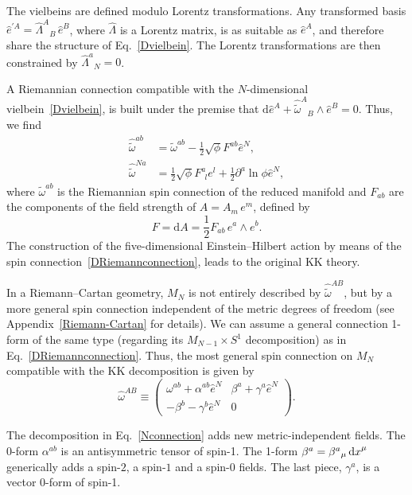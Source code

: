 \documentclass[aps,prd,12pt,superscriptaddress,showpacs,showkeys,reprint,nofootinbib]{revtex4-1}
\begin{document}
The vielbeins are defined modulo Lorentz transformations. Any transformed basis $\hat{e}^{\prime A} = \hat{\Lambda}^A{}_{B}\,\hat{e}^B$,
where $\hat{\Lambda}$ is a Lorentz matrix, is as suitable as $\hat{e}^A$, and therefore share the structure of Eq.~\eqref{Dvielbein}. The Lorentz transformations are then constrained by $\hat{\Lambda}^a{}_{N}=0$.

A Riemannian connection compatible with the \mbox{$N$-dimensional} vielbein~\eqref{Dvielbein}, is built under the premise that $\mbox{d}\hat{e}^A + \hat{\tilde{\omega}}^{A}{}_B \wedge \hat{e}^B = 0$. Thus, we find
\begin{equation}
  \label{DRiemannconnection}
  \begin{split}
    \hat{\tilde{\omega}}^{ab}&=\tilde{\omega}^{ab}-\frac{1}{2}\sqrt{\phi}F^{ab}\hat{e}^N,\\
    \hat{\tilde{\omega}}^{Na}&=\frac{1}{2}\sqrt{\phi}F^a_{\ \ l}e^l+\frac{1}{2}\partial^a\ln\phi\hat{e}^N,
  \end{split}
\end{equation}
where $\tilde{\omega}^{ab}$ is the Riemannian spin connection of the reduced manifold and $F_{ab}$ are the components of the field strength of $A = A_m\, e^m$, defined by
\begin{equation}
  F=\text{d}A=\frac{1}{2}F_{ab}\, e^a\wedge e^b.
\end{equation}
The construction of the five-dimensional Einstein--Hilbert action by means of the spin connection~\eqref{DRiemannconnection}, leads to the original KK theory.

In a Riemann--Cartan geometry, $M_N$ is not entirely described by $\hat{\tilde{\omega}}^{AB}$, but by a more general spin connection independent of the metric degrees of freedom (see Appendix~\ref{Riemann-Cartan} for details). We can assume a general connection 1-form of the same type (regarding its $M_{N-1}\times S^1$ decomposition) as in Eq.~\eqref{DRiemannconnection}. Thus, the most general spin connection on $M_N$ compatible with the KK decomposition is given by 
\begin{equation}\label{Nconnection}
  \hat{\omega}^{AB} \equiv
  \begin{pmatrix}
    \omega^{ab}+\alpha^{ab}\hat{e}^N & \beta^a+\gamma^a\hat{e}^N\\
    -\beta^b-\gamma^b\hat{e}^N & 0
  \end{pmatrix}.
\end{equation}

The decomposition in Eq.~\eqref{Nconnection} adds new metric-independent fields. The 0-form $\alpha^{ab}$ is an antisymmetric tensor of spin-1. The 1-form $\beta^a = \beta^a{}_\mu \mathop{\mathrm{d}x}\nolimits^\mu$ generically adds a spin-$2$, a spin-$1$ and a spin-$0$ fields. The last piece, $\gamma^a$, is a vector $0$-form of spin-1.
\end{document}
